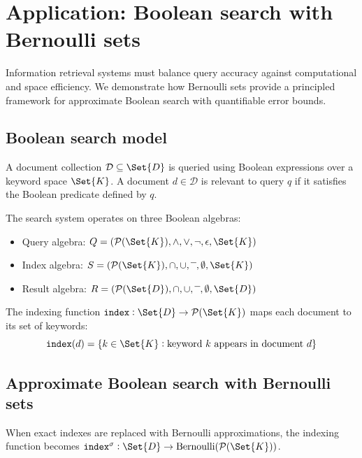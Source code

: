 \documentclass[ ../main.tex]{subfiles}
\begin{document}
\section{Application: Boolean search with Bernoulli sets}
\label{sec:bool_search}

Information retrieval systems must balance query accuracy against computational and space efficiency. We demonstrate how Bernoulli sets provide a principled framework for approximate Boolean search with quantifiable error bounds.

\subsection{Boolean search model}

\begin{definition}
A document collection $\mathcal{D} \subseteq \Set{D}$ is queried using Boolean expressions over a keyword space $\Set{K}$. A document $d \in \mathcal{D}$ is relevant to query $q$ if it satisfies the Boolean predicate defined by $q$.
\end{definition}

The search system operates on three Boolean algebras:
\begin{itemize}
\item Query algebra: $Q = (\mathcal{P}(\Set{K}), \land, \lor, \neg, \epsilon, \Set{K})$
\item Index algebra: $S = (\mathcal{P}(\Set{K}), \cap, \cup, \overline{\phantom{x}}, \emptyset, \Set{K})$
\item Result algebra: $R = (\mathcal{P}(\Set{D}), \cap, \cup, \overline{\phantom{x}}, \emptyset, \Set{D})$
\end{itemize}

The indexing function $\texttt{index}: \Set{D} \to \mathcal{P}(\Set{K})$ maps each document to its set of keywords:
\begin{equation}
\texttt{index}(d) = \{k \in \Set{K} : \text{keyword } k \text{ appears in document } d\}
\end{equation}

\subsection{Approximate Boolean search with Bernoulli sets}

When exact indexes are replaced with Bernoulli approximations, the indexing function becomes $\texttt{index}^\sigma: \Set{D} \to \text{Bernoulli}(\mathcal{P}(\Set{K}))$.
\end{document}

